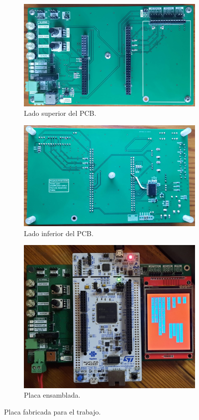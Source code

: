 \begin{figure}[H]
     \centering
     \begin{subfigure}{\textwidth}
         \centering
         \includegraphics[width=.75\textwidth]{./Figures/placa2.jpg}
         \caption{Lado superior del PCB.}
         \label{fig:placa1}
     \end{subfigure}
     \begin{subfigure}{\textwidth}
         \centering
         \includegraphics[width=.75\textwidth]{./Figures/placa3.jpg}
         \caption{Lado inferior del PCB.}
         \label{fig:placa2}
     \end{subfigure}
     \begin{subfigure}{\textwidth}
         \centering
         \includegraphics[width=.75\textwidth]{./Figures/placa1.jpg}
         \caption{Placa ensamblada.}
         \label{fig:placa3}
     \end{subfigure}
        \caption{Placa fabricada para el trabajo.}
        \label{fig:three graphs}
\end{figure}